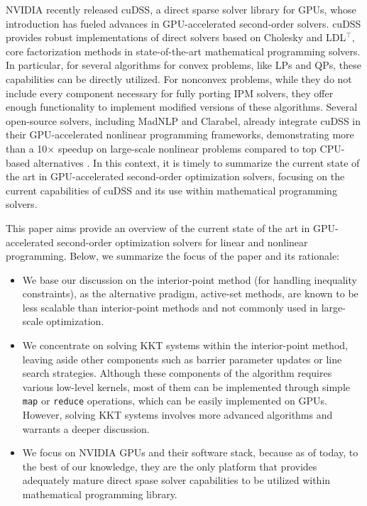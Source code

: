 \documentclass{article}
\begin{document}
NVIDIA recently released cuDSS, a direct sparse solver library for GPUs, whose introduction has fueled advances in GPU-accelerated second-order solvers. cuDSS provides robust implementations of direct solvers based on Cholesky and LDL$^\top$, core factorization methods in state-of-the-art mathematical programming solvers. In particular, for several algorithms for convex problems, like LPs and QPs, these capabilities can be directly utilized. For nonconvex problems, while they do not include every component necessary for fully porting IPM solvers, they offer enough functionality to implement modified versions of these algorithms. Several open-source solvers, including MadNLP and Clarabel, already integrate cuDSS in their GPU-accelerated nonlinear programming frameworks, demonstrating more than a 10× speedup on large-scale nonlinear problems compared to top CPU-based alternatives \cite{}.
In this context, it is timely to summarize the current state of the art in GPU-accelerated second-order optimization solvers, focusing on the current capabilities of cuDSS and its use within mathematical programming solvers.


This paper aims provide an overview of the current state of the art in GPU-accelerated second-order optimization solvers for linear and nonlinear programming. Below, we summarize the focus of the paper and its rationale:
\begin{itemize}[leftmargin=*,itemsep=0pt,parsep=0pt,partopsep=0pt]
\item We base our discussion on the interior-point method (for handling inequality constraints), as the alternative pradigm, active-set methods, are known to be less scalable than interior-point methods \cite{} and not commonly used in large-scale optimization.
\item We concentrate on solving KKT systems within the interior-point method, leaving aside other components such as barrier parameter updates or line search strategies. Although these components of the algorithm requires various low-level kernels, most of them can be implemented through simple \texttt{map} or \texttt{reduce} operations, which can be easily implemented on GPUs. However, solving KKT systems involves more advanced algorithms and warrants a deeper discussion.
\item We focus on NVIDIA GPUs and their software stack, because as of today, to the best of our knowledge, they are the only platform that provides adequately mature direct spase solver capabilities to be utilized within mathematical programming library.
\end{itemize}
\end{document}
